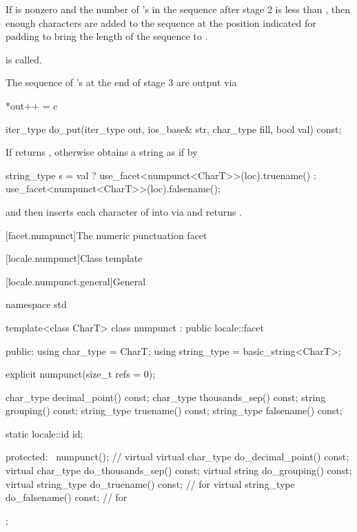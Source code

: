\begin{itemdescr}
\begin{description}
If  is nonzero and the number of 's
in the sequence after stage 2 is less than ,
then enough  characters are added to the sequence
at the position indicated for padding
to bring the length of the sequence to .

 is called.

The sequence of 's at the end of stage 3 are output via
\begin{codeblock}
*out++ = c
\end{codeblock}
\end{description}
\end{itemdescr}

%
\begin{itemdecl}
iter_type do_put(iter_type out, ios_base& str, char_type fill, bool val) const;
\end{itemdecl}

\begin{itemdescr}
\pnum
\returns
If 
returns ,
otherwise obtains a string  as if by
\begin{codeblock}
string_type s =
  val ? use_facet<numpunct<CharT>>(loc).truename()
      : use_facet<numpunct<CharT>>(loc).falsename();
\end{codeblock}
and then inserts each character  of  into 
via 
and returns .
\end{itemdescr}

[facet.numpunct]{The numeric punctuation facet}

[locale.numpunct]{Class template }

[locale.numpunct.general]{General}

%
\begin{codeblock}
namespace std {
  template<class CharT>
    class numpunct : public locale::facet {
    public:
      using char_type   = CharT;
      using string_type = basic_string<CharT>;

      explicit numpunct(size_t refs = 0);

      char_type   decimal_point() const;
      char_type   thousands_sep() const;
      string      grouping()      const;
      string_type truename()      const;
      string_type falsename()     const;

      static locale::id id;

    protected:
      ~numpunct();                                              // virtual
      virtual char_type   do_decimal_point() const;
      virtual char_type   do_thousands_sep() const;
      virtual string      do_grouping()      const;
      virtual string_type do_truename()      const;             // for 
      virtual string_type do_falsename()     const;             // for 
    };
}
\end{codeblock}

